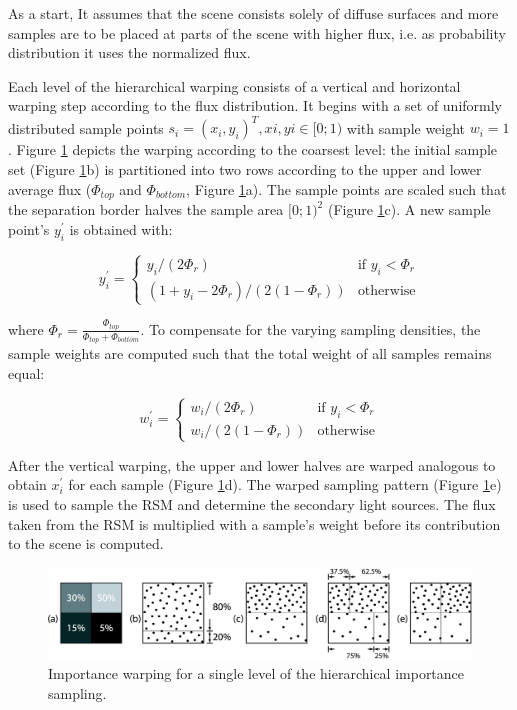 As a start, It assumes that the scene consists solely of diffuse surfaces and more samples are to be placed at parts of the scene with higher flux, i.e. as probability distribution it uses the normalized flux.

Each level of the hierarchical warping consists of a vertical and horizontal warping step according to the flux distribution. It begins with a set of uniformly distributed sample points $s_i = (x_i,y_i)^{T},xi , yi \in [0; 1)$ with sample weight $w_i = 1$. Figure \ref{f:splatting-indirect-illumination-2} depicts the warping according to the coarsest level: the initial sample set (Figure \ref{f:splatting-indirect-illumination-2}b) is partitioned into two rows according to the upper and lower average flux ($\Phi_{top}$ and $\Phi_{bottom}$, Figure \ref{f:splatting-indirect-illumination-2}a). The sample points are scaled such that the separation border halves the sample area $[0; 1)^{2}$ (Figure \ref{f:splatting-indirect-illumination-2}c). A new sample point's $y^{'}_i$ is obtained with:

\begin{equation}
	y^{'}_i=\begin{cases}
		y_i/(2\Phi_r) &\text{if }y_i<\Phi_r\\
		(1+y_i-2\Phi_r)/(2(1-\Phi_r)) & \text{otherwise}
	\end{cases}
\end{equation}

where $\Phi_r=\frac{\Phi_{top}}{\Phi_{top}+\Phi_{bottom}}$. To compensate for the varying sampling densities, the sample weights are computed such that the total weight of all samples remains equal:

\begin{equation}
	w^{'}_i=\begin{cases}
		w_i/(2\Phi_r)     & \text{if }y_i<\Phi_r \\
		w_i/(2(1-\Phi_r)) & \text{otherwise}
	\end{cases}
\end{equation}

After the vertical warping, the upper and lower halves are warped analogous to obtain $x^{'}_i$ for each sample (Figure \ref{f:splatting-indirect-illumination-2}d). The warped sampling pattern (Figure \ref{f:splatting-indirect-illumination-2}e) is used to sample the RSM and determine the secondary light sources. The flux taken from the RSM is multiplied with a sample's weight before its contribution to the scene is computed.

\begin{figure}\label{f:splatting-indirect-illumination-2}
	\begin{center}
		\includegraphics[width=1.0\textwidth]{graphics/ir/ir-3-1}
	\end{center}
	\caption{Importance warping for a single level of the hierarchical importance sampling.}
\end{figure}

